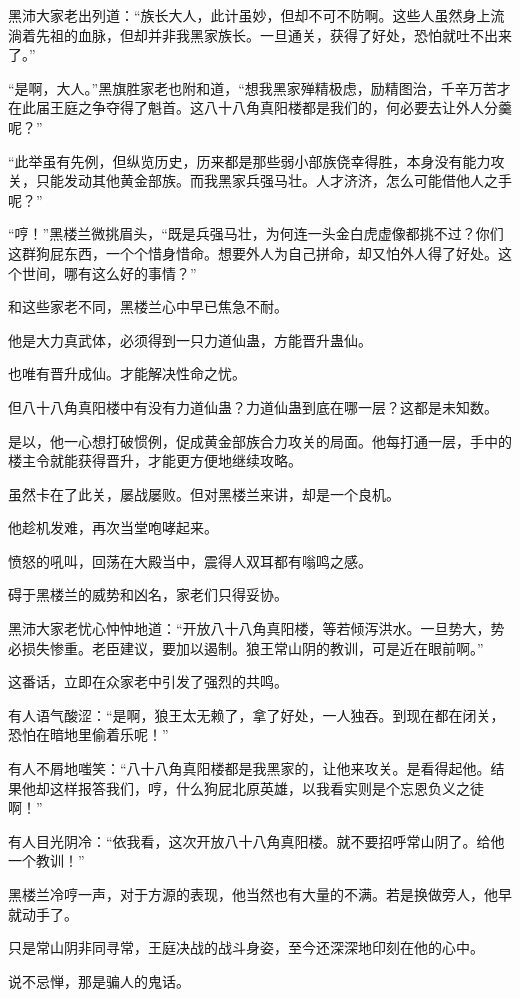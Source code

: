 \begin{this_body}
黑沛大家老出列道：“族长大人，此计虽妙，但却不可不防啊。这些人虽然身上流淌着先祖的血脉，但却并非我黑家族长。一旦通关，获得了好处，恐怕就吐不出来了。”

“是啊，大人。”黑旗胜家老也附和道，“想我黑家殚精极虑，励精图治，千辛万苦才在此届王庭之争夺得了魁首。这八十八角真阳楼都是我们的，何必要去让外人分羹呢？”

“此举虽有先例，但纵览历史，历来都是那些弱小部族侥幸得胜，本身没有能力攻关，只能发动其他黄金部族。而我黑家兵强马壮。人才济济，怎么可能借他人之手呢？”

“哼！”黑楼兰微挑眉头，“既是兵强马壮，为何连一头金白虎虚像都挑不过？你们这群狗屁东西，一个个惜身惜命。想要外人为自己拼命，却又怕外人得了好处。这个世间，哪有这么好的事情？”

和这些家老不同，黑楼兰心中早已焦急不耐。

他是大力真武体，必须得到一只力道仙蛊，方能晋升蛊仙。

也唯有晋升成仙。才能解决性命之忧。

但八十八角真阳楼中有没有力道仙蛊？力道仙蛊到底在哪一层？这都是未知数。

是以，他一心想打破惯例，促成黄金部族合力攻关的局面。他每打通一层，手中的楼主令就能获得晋升，才能更方便地继续攻略。

虽然卡在了此关，屡战屡败。但对黑楼兰来讲，却是一个良机。

他趁机发难，再次当堂咆哮起来。

愤怒的吼叫，回荡在大殿当中，震得人双耳都有嗡鸣之感。

碍于黑楼兰的威势和凶名，家老们只得妥协。

黑沛大家老忧心忡忡地道：“开放八十八角真阳楼，等若倾泻洪水。一旦势大，势必损失惨重。老臣建议，要加以遏制。狼王常山阴的教训，可是近在眼前啊。”

这番话，立即在众家老中引发了强烈的共鸣。

有人语气酸涩：“是啊，狼王太无赖了，拿了好处，一人独吞。到现在都在闭关，恐怕在暗地里偷着乐呢！”

有人不屑地嗤笑：“八十八角真阳楼都是我黑家的，让他来攻关。是看得起他。结果他却这样报答我们，哼，什么狗屁北原英雄，以我看实则是个忘恩负义之徒啊！”

有人目光阴冷：“依我看，这次开放八十八角真阳楼。就不要招呼常山阴了。给他一个教训！”

黑楼兰冷哼一声，对于方源的表现，他当然也有大量的不满。若是换做旁人，他早就动手了。

只是常山阴非同寻常，王庭决战的战斗身姿，至今还深深地印刻在他的心中。

说不忌惮，那是骗人的鬼话。


\end{this_body}

